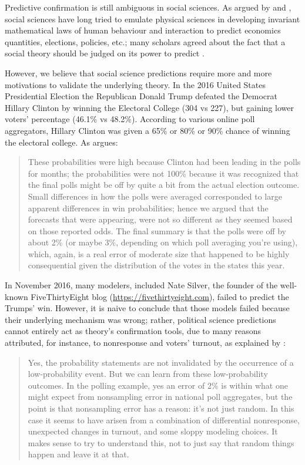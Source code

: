 \documentclass{statsoc}
\begin{document}
Predictive confirmation is still ambiguous in social sciences. As argued by \cite{popper1944poverty, popper1945poverty} and \cite{sarewitz1999prediction}, social sciences 
have long tried to emulate physical sciences in developing invariant mathematical laws of human behaviour and interaction to predict economics quantities, elections, policies, etc.; 
many scholars agreed about the fact that a social theory should be judged on its power to predict \citep{friedman1953essays}. 

However, we believe that social science predictions require more and more motivations to validate the underlying theory. In the 2016 United States Presidential Election the Republican Donald Trump defeated the Democrat Hillary Clinton by winning the Electoral College (304 vs 227), but gaining lower voters' percentage (46.1\% vs 48.2\%). According to various online poll aggregators, Hillary Clinton was given a 65\% or 80\% or 90\% chance of winning the electoral college.  As \cite{gelman2016elections} argues:

\begin{quote}
 These probabilities were high because Clinton had been leading in the polls for months; the probabilities were not 100\% because it was recognized that the final polls might be off by quite a bit from the actual election outcome. Small differences in how the polls were averaged corresponded to large apparent differences in win probabilities; hence we argued that the forecasts that were appearing, were not so different as they seemed based on those reported odds. The final summary is that the polls were off by about 2\% (or maybe 3\%, depending on which poll averaging you’re using), which, again, is a real error of moderate size that happened to be highly consequential given the distribution of the votes in the states this year.
\end{quote}
%
In November 2016, many modelers, included Nate Silver, the founder of the well-known FiveThirtyEight blog (\url{https://fivethirtyeight.com}), failed to predict the Trumps' win. However, it is naive to conclude that those models failed because their underlying mechanism was wrong; rather, political science predictions cannot  entirely act as theory's confirmation tools, due to many reasons attributed, for instance, to nonresponse and voters' turnout, as explained by \cite{gelman2016elections2}:

\begin{quote}
Yes, the probability statements are not invalidated by the occurrence of a low-probability event. But we can learn from these low-probability outcomes. In the polling example, yes an error of 2\% is within what one might expect from nonsampling error in national poll aggregates, but the point is that nonsampling error has a reason: it’s not just random. In this case it seems to have arisen from a combination of differential nonresponse, unexpected changes in turnout, and some sloppy modeling choices. It makes sense to try to understand this, not to just say that random things happen and leave it at that.
\end{quote}
\end{document}
